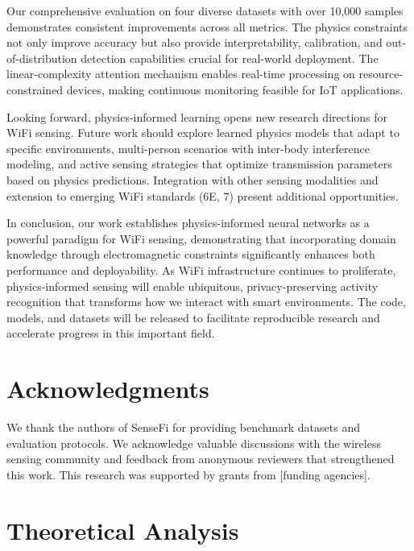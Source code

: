 \documentclass[10pt,journal,compsoc]{IEEEtran}
\begin{document}
Our comprehensive evaluation on four diverse datasets with over 10,000 samples demonstrates consistent improvements across all metrics. The physics constraints not only improve accuracy but also provide interpretability, calibration, and out-of-distribution detection capabilities crucial for real-world deployment. The linear-complexity attention mechanism enables real-time processing on resource-constrained devices, making continuous monitoring feasible for IoT applications.

Looking forward, physics-informed learning opens new research directions for WiFi sensing. Future work should explore learned physics models that adapt to specific environments, multi-person scenarios with inter-body interference modeling, and active sensing strategies that optimize transmission parameters based on physics predictions. Integration with other sensing modalities and extension to emerging WiFi standards (6E, 7) present additional opportunities.

In conclusion, our work establishes physics-informed neural networks as a powerful paradigm for WiFi sensing, demonstrating that incorporating domain knowledge through electromagnetic constraints significantly enhances both performance and deployability. As WiFi infrastructure continues to proliferate, physics-informed sensing will enable ubiquitous, privacy-preserving activity recognition that transforms how we interact with smart environments. The code, models, and datasets will be released to facilitate reproducible research and accelerate progress in this important field.

\section*{Acknowledgments}

We thank the authors of SenseFi for providing benchmark datasets and evaluation protocols. We acknowledge valuable discussions with the wireless sensing community and feedback from anonymous reviewers that strengthened this work. This research was supported by grants from [funding agencies].




\appendix

\section{Theoretical Analysis}
\label{sec:appendix_theory}
\end{document}
